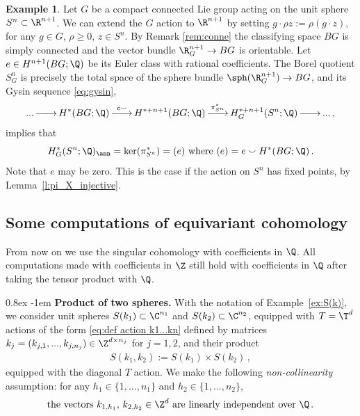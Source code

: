 \documentclass[11pt,a4paper,reqno]{article}
\makeatletter
\renewcommand{\paragraph}{%
  \@startsection{paragraph}{4}{\z@}%
  {0.8ex}  %
  {-1em}   %
  {\normalfont\bfseries}%
}
\DeclareMathOperator*{\ttoup}{\llongrightarrow}
\DeclareRobustCommand{\llongrightarrow}{\relbar\joinrel\relbar\joinrel\rightarrow}
\numberwithin{equation}{section}
\theoremstyle{definition}
\newtheorem{example}[theorem]{Example}
\makeatother
\begin{document}
\begin{example}\label{ex:sphere_ann}
Let $ G $ be a compact connected Lie group acting on the unit sphere $S^n \subset  \R^{n+1}$. 
We can extend the $G$ action to $ \R^{n+1}$ by setting 
$ g\cdot \rho z:=\rho(g\cdot z) $, 
for any 
$ g\in G $, $ \rho \geq 0  $, $ z\in S^n $. By Remark \ref{rem:conne}
 the classifying space $BG$ is simply connected
 and 
the vector bundle $ \R^{n+1}_G\to BG$ is orientable. Let  $e\in H^{n+1}(BG;\Q)$ be its Euler class with rational coefficients. 
The Borel quotient $ S^n_G $ is precisely the total space of the sphere bundle $\sph (\R^{n+1}_G)\to BG$, and its Gysin sequence  \eqref{eq:gysin}, 
\begin{align*}
...
\ttoup
H^*(BG;\Q)
\ttoup^{e\smallsmile}
H^{*+n+1}(BG;\Q)
\ttoup^{\pi_{S^n}^*}
H^{*+n+1}_G(S^n;\Q)
\ttoup... \, , 
\end{align*}
implies that
\begin{equation}
\label{annsfera}
    H^*_G(S^n;\Q)_\ann = 
    \ker (\pi_{S^n}^*) = (e) 
    \
    \text{where} \ 
    (e)=e\smallsmile H^*(BG;\Q) \, .   
\end{equation}
Note that $e$ may be zero.
This is the case if the action on $S^n$ has fixed points, by Lemma~\ref{l:pi_X_injective}.
\end{example}






\subsection{Some computations of equivariant cohomology}\label{sec:computations}

From now on we use the singular cohomology with coefficients in 
$\Q$.
All computations made with coefficients in $\Z$ still hold with coefficients in $\Q$
after taking the tensor product with $\Q$.


\paragraph{\bf Product of two spheres.}
With the notation of Example~\ref{ex:S(k)}, 
 we consider unit  spheres $S(k_1) \subset \C^{n_1}$ and $S(k_2) \subset \C^{n_2} $, equipped with $ T=\T^d $ actions of the form \eqref{eq:def action k1...kn}
defined by matrices   
$k_j=(k_{j,1},...,k_{j,n_j})
\in\Z^{d\times n_j}$ for $ j = 1,2 $,  and their product
\begin{align}\label{eq:defProduct of two spheres}
S(k_1,k_2) := S(k_1)\times S(k_2) \, ,
\end{align}
equipped with the diagonal $T$ action. We make the following \emph{non-collinearity} assumption: 
for any $h_1\in\{1,...,n_1\}$ and $h_2\in\{1,...,n_2\}$,
\begin{equation}\label{eq:non-coll}
    \text{the vectors} \ k_{1,h_1},\, k_{2,h_2} \in \Z^d \ \text{are linearly independent over} \ \Q\,.
\end{equation}
\end{document}
